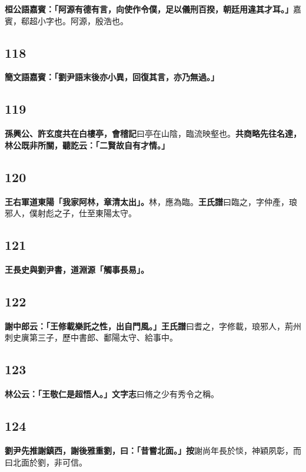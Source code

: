 \textbf{桓公語嘉賓：「阿源有德有言，向使作令僕，足以儀刑百揆，朝廷用違其才耳。」}{\footnotesize 嘉賓，郗超小字也。阿源，殷浩也。}

\subsection*{118}

\textbf{簡文語嘉賓：「劉尹語末後亦小異，回復其言，亦乃無過。」}

\subsection*{119}

\textbf{孫興公、許玄度共在白樓亭，}{\footnotesize \textbf{會稽記}曰亭在山陰，臨流映壑也。}\textbf{共商略先往名達，林公既非所關，聽訖云：「二賢故自有才情。」}

\subsection*{120}

\textbf{王右軍道東陽「我家阿林，章清太出」。}{\footnotesize 林，應為臨。\textbf{王氏譜}曰臨之，字仲產，琅邪人，僕射彪之子，仕至東陽太守。}

\subsection*{121}

\textbf{王長史與劉尹書，道淵源「觸事長易」。}

\subsection*{122}

\textbf{謝中郎云：「王修載樂託之性，出自門風。」}{\footnotesize \textbf{王氏譜}曰耆之，字修載，琅邪人，荊州刺史廙第三子，歷中書郎、鄱陽太守、給事中。}

\subsection*{123}

\textbf{林公云：「王敬仁是超悟人。」}{\footnotesize \textbf{文字志}曰脩之少有秀令之稱。}

\subsection*{124}

\textbf{劉尹先推謝鎮西，謝後雅重劉，曰：「昔嘗北面。」}{\footnotesize \textbf{按}謝尚年長於惔，神穎夙彰，而曰北面於劉，非可信。}


